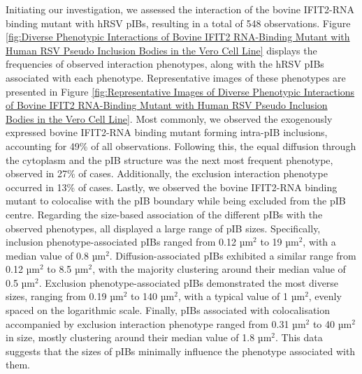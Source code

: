 Initiating our investigation, we assessed the interaction of the bovine IFIT2-RNA binding mutant with hRSV pIBs, resulting in a total of 548 observations. Figure \ref{fig:Diverse Phenotypic Interactions of Bovine IFIT2 RNA-Binding Mutant with Human RSV Pseudo Inclusion Bodies in the Vero Cell Line} displays the frequencies of observed interaction phenotypes, along with the hRSV pIBs associated with each phenotype. Representative images of these phenotypes are presented in Figure \ref{fig:Representative Images of Diverse Phenotypic Interactions of Bovine IFIT2 RNA-Binding Mutant with Human RSV Pseudo Inclusion Bodies in the Vero Cell Line}. Most commonly, we observed the exogenously expressed bovine IFIT2-RNA binding mutant forming intra-pIB inclusions, accounting for 49\% of all observations. Following this, the equal diffusion through the cytoplasm and the pIB structure was the next most frequent phenotype, observed in 27\% of cases. Additionally, the exclusion interaction phenotype occurred in 13\% of cases. Lastly, we observed the bovine IFIT2-RNA binding mutant to colocalise with the pIB boundary while being excluded from the pIB centre. Regarding the size-based association of the different pIBs with the observed phenotypes, all displayed a large range of pIB sizes. Specifically, inclusion phenotype-associated pIBs ranged from 0.12 \(\mbox{µm}^2\) to 19 \(\mbox{µm}^2\), with a median value of 0.8 \(\mbox{µm}^2\). Diffusion-associated pIBs exhibited a similar range from 0.12 \(\mbox{µm}^2\) to 8.5 \(\mbox{µm}^2\), with the majority clustering around their median value of 0.5 \(\mbox{µm}^2\). Exclusion phenotype-associated pIBs demonstrated the most diverse sizes, ranging from 0.19 \(\mbox{µm}^2\) to 140 \(\mbox{µm}^2\), with a typical value of 1 \(\mbox{µm}^2\), evenly spaced on the logarithmic scale. Finally, pIBs associated with colocalisation accompanied by exclusion interaction phenotype ranged from 0.31 \(\mbox{µm}^2\) to 40 \(\mbox{µm}^2\) in size, mostly clustering around their median value of 1.8 \(\mbox{µm}^2\). This data suggests that the sizes of pIBs minimally influence the phenotype associated with them.


